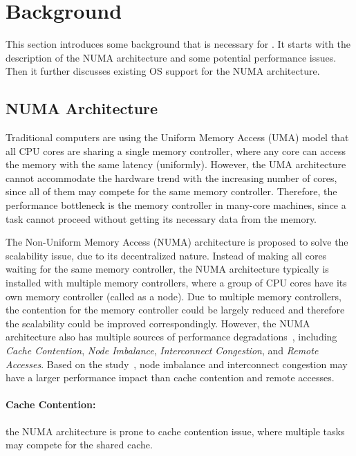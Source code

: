 \section{Background}
\label{sec:overview}

This section introduces some background that is necessary for \NM{}. It starts with the description of the NUMA architecture and some potential performance issues. Then it further discusses existing OS support for the NUMA architecture.  

\subsection{NUMA Architecture}

\label{sec:numa}

Traditional computers are using the Uniform Memory Access (UMA) model that all CPU cores are sharing a single memory controller, where any core can access the memory with the same latency (uniformly). However, the UMA architecture cannot accommodate the hardware trend with the increasing number of cores, since all of them may compete for the same memory controller. Therefore, the performance bottleneck is the memory controller in many-core machines, since a task cannot proceed without getting its necessary data from the memory. 

The Non-Uniform Memory Access (NUMA) architecture is proposed to solve the scalability issue, due to its decentralized nature. Instead of making all cores waiting for the same memory controller, the NUMA architecture typically is installed with multiple memory controllers, where a group of CPU cores have its own memory controller (called as a node). Due to multiple memory controllers, the contention for the memory controller could be largely reduced and therefore the scalability could be improved correspondingly. However, the NUMA architecture also has multiple sources of performance degradations~\cite{Blagodurov:2011:CNC:2002181.2002182}, including \textit{Cache Contention}, \textit{Node Imbalance}, \textit{Interconnect Congestion}, and \textit{Remote Accesses}. Based on the study~\cite{Blagodurov:2011:CNC:2002181.2002182}, node imbalance and interconnect congestion may have a larger performance impact than cache contention and remote accesses. 

\paragraph{Cache Contention:} the NUMA architecture is prone to cache contention issue, where multiple tasks may compete for the shared cache. 
 
